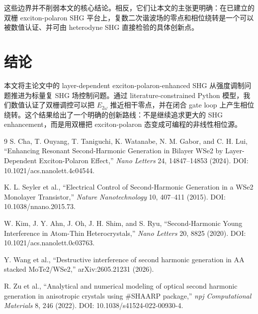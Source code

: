 \documentclass[UTF8,a4paper,11pt]{ctexart}
\begin{document}
这些边界并不削弱本文的核心结论。相反，它们让本文的主张更明确：在已建立的双栅 exciton-polaron SHG 平台上，复数二次谐波场的零点和相位绕转是一个可以被数值认证、并可由 heterodyne SHG 直接检验的具体创新点。

\section{结论}
本文将主论文中的 layer-dependent exciton-polaron-enhanced SHG 从强度调制问题推进为标量复 SHG 场控制问题。通过 literature-constrained Python 模型，我们数值认证了双栅调控可以把 $E_{2\omega}$ 推近相干零点，并在闭合 gate loop 上产生相位绕转。这个结果给出了一个明确的创新路线：不是继续追求更大的 SHG enhancement，而是用双栅把 exciton-polaron 态变成可编程的非线性相位源。

\begin{thebibliography}{9}
S. Cha, T. Ouyang, T. Taniguchi, K. Watanabe, N. M. Gabor, and C. H. Lui, ``Enhancing Resonant Second-Harmonic Generation in Bilayer WSe2 by Layer-Dependent Exciton-Polaron Effect,'' \emph{Nano Letters} 24, 14847--14853 (2024). DOI: 10.1021/acs.nanolett.4c04544.

K. L. Seyler et al., ``Electrical Control of Second-Harmonic Generation in a WSe2 Monolayer Transistor,'' \emph{Nature Nanotechnology} 10, 407--411 (2015). DOI: 10.1038/nnano.2015.73.

W. Kim, J. Y. Ahn, J. Oh, J. H. Shim, and S. Ryu, ``Second-Harmonic Young Interference in Atom-Thin Heterocrystals,'' \emph{Nano Letters} 20, 8825 (2020). DOI: 10.1021/acs.nanolett.0c03763.

Y. Wang et al., ``Destructive interference of second harmonic generation in AA stacked MoTe2/WSe2,'' arXiv:2605.21231 (2026).

R. Zu et al., ``Analytical and numerical modeling of optical second harmonic generation in anisotropic crystals using \#SHAARP package,'' \emph{npj Computational Materials} 8, 246 (2022). DOI: 10.1038/s41524-022-00930-4.
\end{thebibliography}
\end{document}
